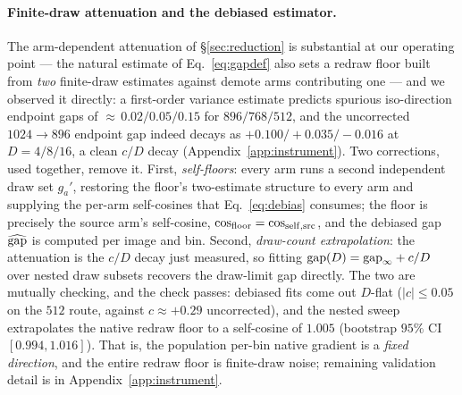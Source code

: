 \paragraph{Finite-draw attenuation and the debiased estimator.}
The arm-dependent attenuation of \S\ref{sec:reduction} is
substantial at our operating point — the natural estimate of
Eq.~\ref{eq:gapdef} also sets a redraw floor built from \emph{two}
finite-draw estimates against demote arms contributing one — and we
observed it directly: a first-order variance estimate predicts
spurious iso-direction endpoint gaps of
${\approx}\,0.02/0.05/0.15$ for $896/768/512$, and the uncorrected
$1024{\to}896$ endpoint gap indeed decays as
${+}0.100/{+}0.035/{-}0.016$ at $D = 4/8/16$, a clean $c/D$ decay
(Appendix~\ref{app:instrument}). Two corrections, used together,
remove it. First, \emph{self-floors}: every arm runs a second
independent draw set $g_a'$, restoring the floor's two-estimate
structure to every arm and supplying the per-arm self-cosines that
Eq.~\ref{eq:debias} consumes; the floor is precisely the source
arm's self-cosine, $\cos_{\mathrm{floor}} = \cos_{\mathrm{self},\mathrm{src}}$,
and the debiased gap $\widehat{\mathrm{gap}}$ is computed per image and bin. Second,
\emph{draw-count extrapolation}: the attenuation is the $c/D$ decay
just measured, so fitting $\mathrm{gap}(D) = \mathrm{gap}_\infty + c/D$ over nested
draw subsets recovers the draw-limit gap directly. The two are
mutually checking, and the check passes: debiased fits come out
$D$-flat ($|c| \le 0.05$ on the $512$ route, against
$c \approx +0.29$ uncorrected), and the nested sweep extrapolates the
native redraw floor to a self-cosine of $1.005$ (bootstrap $95\%$ CI
$[0.994, 1.016]$). That is, the population per-bin native gradient is
a \emph{fixed direction}, and the entire redraw floor is finite-draw
noise; remaining validation detail is in
Appendix~\ref{app:instrument}.

